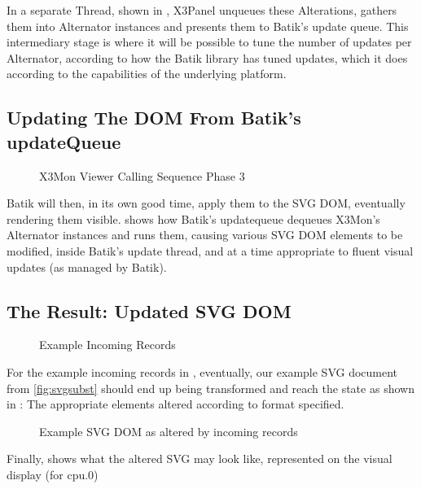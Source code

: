 In a separate Thread, shown in , X3Panel
unqueues these Alterations, gathers them into Alternator instances
and presents them to Batik's update queue.  This intermediary stage is
where it will be possible to tune the number of updates per Alternator,
according to how the Batik library has tuned updates, which it does
according to the capabilities of the underlying platform.

\subsection*{Updating The DOM From Batik's updateQueue}

\begin{figure}[htbp]
	\centering
	\caption{X3Mon Viewer Calling Sequence Phase 3}
	\label{fig:viewersequence3}
\end{figure}

Batik will then, in its own good time, apply them to the SVG DOM,
eventually rendering them visible.  shows
how Batik's updatequeue dequeues X3Mon's Alternator instances and runs
them, causing various SVG DOM elements to be modified, inside Batik's
update thread, and at a time appropriate to fluent visual updates (as
managed by Batik).

\subsection*{The Result: Updated SVG DOM}

\begin{figure}[htbp]
	\caption{Example Incoming \rawproto{} Records}
	\label{fig:examplerecords}
\end{figure}

For the example incoming \rawproto{} records in
, eventually, our example SVG document from
\ref{fig:svgsubst} should end up being transformed and reach the state
as shown in : The appropriate elements altered
according to format specified.

\begin{figure}[htbp]
	\caption{Example SVG DOM as altered by incoming records}
	\label{fig:svgaltered}
\end{figure}

Finally,  shows what the altered SVG may
look like, represented on the visual display (for cpu.0)

